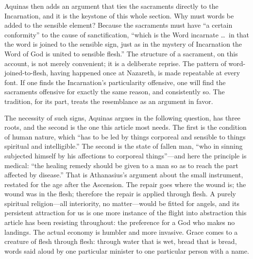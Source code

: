 Aquinas then adds an argument that ties the sacraments directly to the Incarnation, and it is the keystone of this whole section. Why must words be added to the sensible element? Because the sacraments must have ``a certain conformity'' to the cause of sanctification, ``which is the Word incarnate \ldots\ in that the word is joined to the sensible sign, just as in the mystery of Incarnation the Word of God is united to sensible flesh.'' The structure of a sacrament, on this account, is not merely convenient; it is a deliberate reprise. The pattern of word-joined-to-flesh, having happened once at Nazareth, is made repeatable at every font. If one finds the Incarnation's particularity offensive, one will find the sacraments offensive for exactly the same reason, and consistently so. The tradition, for its part, treats the resemblance as an argument in favor.

The necessity of such signs, Aquinas argues in the following question, has three roots, and the second is the one this article most needs. The first is the condition of human nature, which ``has to be led by things corporeal and sensible to things spiritual and intelligible.'' The second is the state of fallen man, ``who in sinning subjected himself by his affections to corporeal things''---and here the principle is medical: ``the healing remedy should be given to a man so as to reach the part affected by disease.'' That is Athanasius's argument about the small instrument, restated for the age after the Ascension. The repair goes where the wound is; the wound was in the flesh; therefore the repair is applied through flesh. A purely spiritual religion---all interiority, no matter---would be fitted for angels, and its persistent attraction for us is one more instance of the flight into abstraction this article has been resisting throughout: the preference for a God who makes no landings. The actual economy is humbler and more invasive. Grace comes to a creature of flesh through flesh: through water that is wet, bread that is bread, words said aloud by one particular minister to one particular person with a name.

